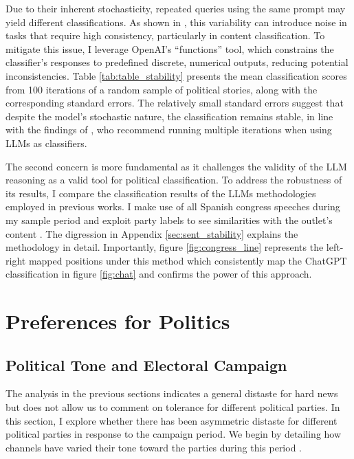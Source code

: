 \documentclass[12pt]{article}
\begin{document}
	Due to their inherent stochasticity, repeated queries using the same prompt may yield different classifications. As shown in \citet{llmclassification2024}, this variability can introduce noise in tasks that require high consistency, particularly in content classification. To mitigate this issue, I leverage OpenAI’s ``functions''  tool, which constrains the classifier’s responses to predefined discrete, numerical outputs, reducing potential inconsistencies.  Table \ref{tab:table_stability} presents the mean classification scores from 100 iterations of a random sample of political stories, along with the corresponding standard errors. The relatively small standard errors suggest that despite the model’s stochastic nature, the classification remains stable, in line with the findings of \citet{llmstability2024}, who recommend running multiple iterations when using LLMs as classifiers.
	
	
	The second concern is more fundamental as it challenges the validity of the LLM reasoning as a valid tool for political classification. To address the robustness of its results, I compare the classification results of the LLMs methodologies employed in previous works. I make use of all Spanish congress speeches during my sample period and exploit party labels  to see similarities with the outlet's content \citep{gentzkow2010media}  \citep{laver2003extracting}. The digression in Appendix \ref{sec:sent_stability} explains the methodology in detail. Importantly, figure \ref{fig:congress_line} represents the left-right mapped positions under this method which consistently map the ChatGPT classification in figure \ref{fig:chat} and confirms the power of this approach. 
	
	
	
	\section{Preferences for Politics}\label{section:politics}
	
	\subsection{Political Tone and Electoral Campaign}
	
	The analysis in the previous sections indicates a general distaste for hard news but does not allow us to comment on tolerance for different political parties. In this section, I explore whether there has been asymmetric distaste for different political parties in response to the campaign period. We begin by detailing how channels have varied their tone toward the parties during this period \citep{independent2023vox}.
	
\end{document}
